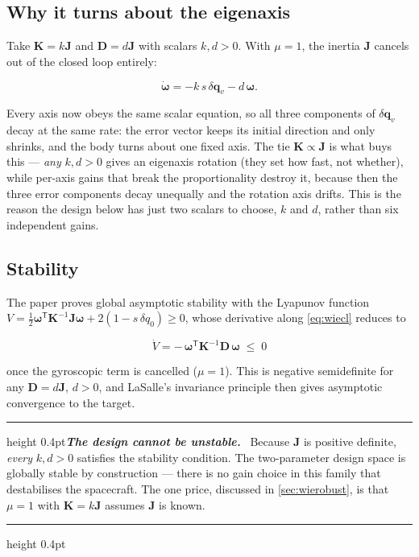 \documentclass[conference,10pt,a4paper]{IEEEtran}
\newcommand{\remarkrule}{\par\nobreak\vspace{2pt}%
  \hrule height 0.4pt\vspace{4pt}\nobreak}
\newenvironment{keybox}[1][Result]
  {\par\medskip\remarkrule\noindent\small\textbf{\textit{#1.}}\ \ignorespaces}
  {\par\vspace{3pt}\hrule height 0.4pt\par\medskip\ignorespacesafterend}
\newcommand{\vect}[1]{\bm{#1}}
\newcommand{\mat}[1]{\bm{#1}}
\newcommand{\T}{^{\mathsf{T}}}
\begin{document}
\subsection{Why it turns about the eigenaxis}
\label{sec:eigenaxis}

Take $\mat{K}=k\mat{J}$ and $\mat{D}=d\mat{J}$ with scalars $k,d>0$. With
$\mu=1$, the inertia $\mat{J}$ cancels out of the closed loop entirely:

\begin{equation}
\dot{\vect{\omega}} = -k\,s\,\delta\vect{q}_v - d\,\vect{\omega}.
\label{eq:wiecl}
\end{equation}

Every axis now obeys the same scalar equation, so all three components of
$\delta\vect{q}_v$ decay at the same rate: the error vector keeps its initial
direction and only shrinks, and the body turns about one fixed axis. The tie
$\mat{K}\propto\mat{J}$ is what buys this --- \emph{any} $k,d>0$ gives an
eigenaxis rotation (they set how fast, not whether), while per-axis gains that
break the proportionality destroy it, because then the three error components
decay unequally and the rotation axis drifts. This is the reason the design
below has just two scalars to choose, $k$ and $d$, rather than six independent
gains.

\subsection{Stability}
\label{sec:wiestab}

The paper proves global asymptotic stability with the Lyapunov function
$V = \tfrac{1}{2}\vect{\omega}\T\mat{K}^{-1}\mat{J}\vect{\omega}
 + 2(1-s\,\delta q_0)\ge 0$, whose derivative along \cref{eq:wiecl} reduces to

\begin{equation}
\dot{V} = -\,\vect{\omega}\T\mat{K}^{-1}\mat{D}\,\vect{\omega} \;\le\; 0
\label{eq:V}
\end{equation}

once the gyroscopic term is cancelled ($\mu=1$). This is negative
semidefinite for any $\mat{D}=d\mat{J}$, $d>0$, and LaSalle's invariance
principle \cite{khalil} then gives asymptotic convergence to the target.

\begin{keybox}[The design cannot be unstable]
Because $\mat{J}$ is positive definite, \emph{every} $k,d>0$ satisfies the
stability condition. The two-parameter design space is globally stable by
construction --- there is no gain choice in this family that destabilises the
spacecraft. The one price, discussed in \cref{sec:wierobust}, is that $\mu=1$
with $\mat{K}=k\mat{J}$ assumes $\mat{J}$ is known.
\end{keybox}
\end{document}
